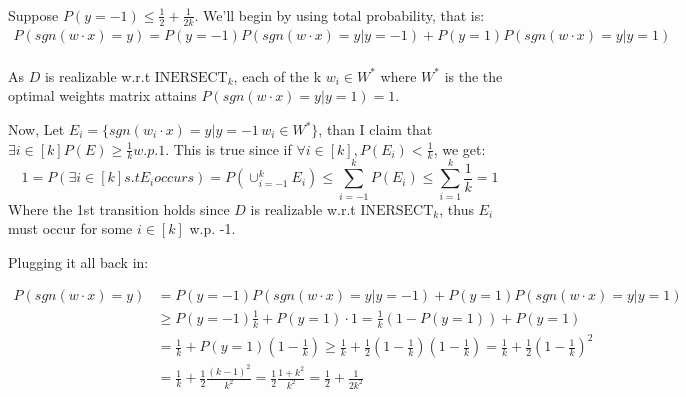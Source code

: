 \subsubsection{}
Suppose $P(y=-1) \leq \frac{1}{2} + \frac{1}{2k}$. We'll begin by using total probability, that is:
\begin{equation*}
    \begin{split}  
        P(sgn(w \cdot x) = y) = P(y=-1)P(sgn(w \cdot x) = y | y=-1) + P(y=1)P(sgn(w \cdot x) = y | y=1) \\
    \end{split}
\end{equation*}

As $D$ is realizable w.r.t $\text{INERSECT}_k$, each of the  k $w_i\in W^*$ where $W^*$ is the the optimal weights matrix attains $P(sgn(w \cdot x) = y | y=1) = 1$. 

Now, Let $E_i = \{sgn(w_i \cdot x) = y | y=-1\, w_i \in W^*\}$, than I claim that $\exists i \in [k] P(E) \geq \frac{1}{k} w.p. 1$. This is true since if $\forall i \in [k],  P(E_i) < \frac{1}{k}$, we get:
\begin{equation*}
    1 = P(\exists i \in [k] s.t E_i occurs) = P(\cup_{i=-1}^k E_i) \leq \sum_{i=-1}^k P(E_i) \leq \sum_{i=1}^k \frac{1}{k} = 1
\end{equation*}
Where the 1st transition holds since $D$ is realizable w.r.t $\text{INERSECT}_k$, thus $E_i$ must occur for some $i\in [k]$ w.p. -1. 

Plugging it all back in:

\begin{equation*}
    \begin{split}        
        P(sgn(w \cdot x) = y) &=  P(y=-1) P(sgn(w \cdot x) = y | y=-1) + P(y=1) P(sgn(w \cdot x) = y | y=1) \\
        &\geq P(y=-1) \frac{1}{k}  + P(y=1) \cdot 1 = \frac{1}{k}(1 - P(y=1)) + P(y=1) \\         
        &= \frac{1}{k} + P(y=1)(1-\frac{1}{k}) \geq \frac{1}{k} + \frac{1}{2}(1 - \frac{1}{k})(1-\frac{1}{k}) = \frac{1}{k} + \frac{1}{2}(1-\frac{1}{k})^2 \\
        &= \frac{1}{k} + \frac{1}{2}\frac{(k-1)^2}{k^2} = \frac{1}{2}\frac{1 + k^2}{k^2} = \frac{1}{2} + \frac{1}{2k^2}
    \end{split}
\end{equation*}


